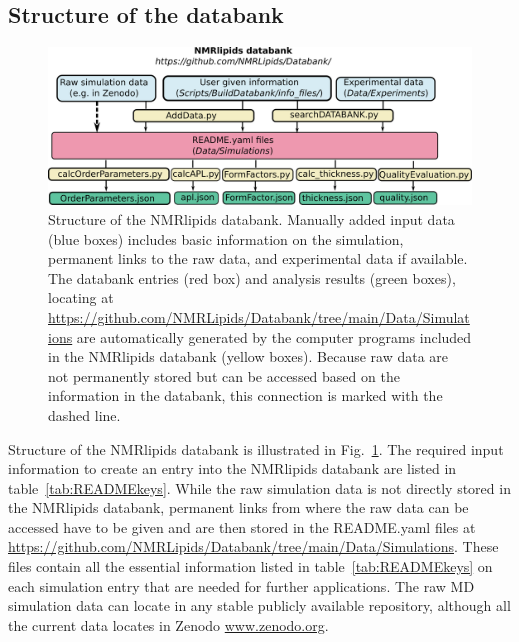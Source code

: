 \documentclass[fleqn,10pt]{wlscirep}
\begin{document}
\subsection{Structure of the databank}

\begin{figure}
  \includegraphics[width=\textwidth]{Figures/DataBankChart.pdf}
  \caption{Structure of the NMRlipids databank. Manually added input data (blue boxes) includes basic information on the simulation, permanent links to the raw data, and experimental data if available. The databank entries (red box) and analysis results (green boxes), locating at \url{https://github.com/NMRLipids/Databank/tree/main/Data/Simulations} are automatically generated by the computer programs included in the NMRlipids databank (yellow boxes). Because raw data are not permanently stored but can be accessed based on the information in the databank, this connection is marked with the dashed line. }\label{DatabankStructure}
\end{figure}

Structure of the NMRlipids databank is illustrated in Fig.~\ref{DatabankStructure}. The required input information to create an entry into the NMRlipids databank are listed in table~\ref{tab:READMEkeys}. While the raw simulation data is not directly stored in the NMRlipids databank, permanent links from where the raw data can be accessed have to be given and are then stored in the README.yaml files at \url{https://github.com/NMRLipids/Databank/tree/main/Data/Simulations}. These files contain all the essential information listed in table~\ref{tab:READMEkeys} on each simulation entry that are needed for further applications. The raw MD simulation data can locate in any stable publicly available repository, although all the current data locates in Zenodo \url{www.zenodo.org}. 

\end{document}
